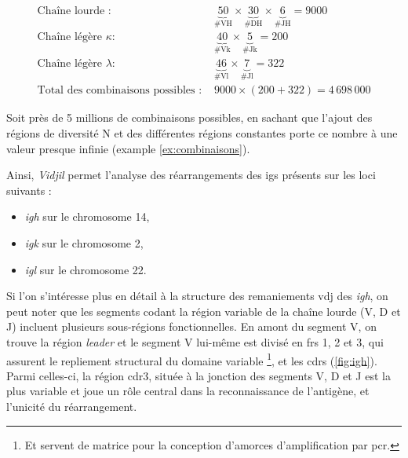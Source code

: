 \begin{examplebox}[label={ex:combinaisons}]
    \begin{equation}
        \begin{aligned}
            \text{Chaîne lourde : }                    & \underbrace{50}_{\text{\# VH}} \times \underbrace{30}_{\text{\# DH}} \times \underbrace{6}_{\text{\# JH}} = 9000 \\
            \text{Chaîne légère } \kappa :             & \underbrace{40}_{\text{\# Vk}} \times \underbrace{5}_{\text{\# Jk}} = 200                                        \\
            \text{Chaîne légère } \lambda :            & \underbrace{46}_{\text{\# Vl}} \times \underbrace{7}_{\text{\# Jl}} = 322                                        \\
            \text{Total des combinaisons possibles : } & 9000 \times (200 + 322) = 4\,698\,000
        \end{aligned}
    \end{equation}
\end{examplebox}

Soit près de 5 millions de combinaisons possibles, en sachant que l'ajout des
régions de diversité N et des différentes régions constantes porte ce nombre à
une valeur presque infinie (example \autoref{ex:combinaisons}).

\newpage

Ainsi, \textit{Vidjil} permet l'analyse des réarrangements des \glspl{ig}
présents sur les loci suivants :
\begin{itemize}
    \item \textit{\gls{igh}} sur le chromosome 14,
    \item \textit{\gls{igk}} sur le chromosome 2,
    \item \textit{\gls{igl}} sur le chromosome 22.
\end{itemize}



Si l'on s'intéresse plus en détail à la structure des remaniements \gls{vdj}
des \textit{\gls{igh}}, on peut noter que les segments codant la région
variable de la chaîne lourde (V, D et J) incluent plusieurs sous-régions
fonctionnelles. En amont du segment V, on trouve la région \textit{leader} et
le segment V lui-même est divisé en \glspl{fr} 1, 2 et 3, qui assurent le
repliement structural du domaine variable \footnote{Et servent de matrice pour
la conception d'amorces d'amplification par \gls{pcr}.}, et les \glspl{cdr}
(\autoref{fig:igh}). Parmi celles-ci, la région \gls{cdr}3, située à la
jonction des segments V, D et J est la plus variable et joue un rôle central
dans la reconnaissance de l'antigène, et l'unicité du réarrangement.

